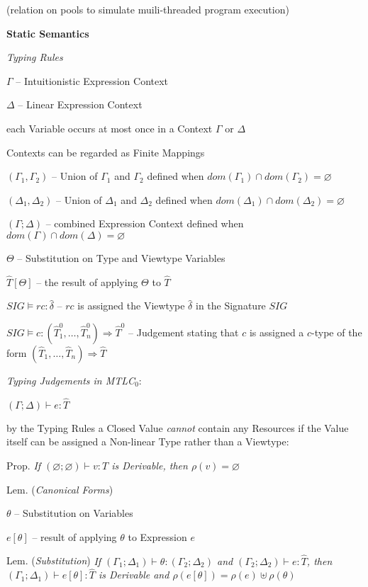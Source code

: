 (relation on pools to simulate muili-threaded program execution) %


\textbf{Static Semantics}

\emph{Typing Rules}


$\Gamma$ -- Intuitionistic Expression Context

$\Delta$ -- Linear Expression Context

each Variable occurs at most once in a Context $\Gamma$ or $\Delta$

Contexts can be regarded as Finite Mappings

$(\Gamma_1, \Gamma_2)$ -- Union of $\Gamma_1$ and $\Gamma_2$ defined
when $dom(\Gamma_1) \cap dom(\Gamma_2) = \varnothing$

$(\Delta_1, \Delta_2)$ -- Union of $\Delta_1$ and $\Delta_2$ defined
when $dom(\Delta_1) \cap dom(\Delta_2) = \varnothing$

$(\Gamma;\Delta)$ -- combined Expression Context defined when
$dom(\Gamma) \cap dom(\Delta) = \varnothing$

$\Theta$ -- Substitution on Type and Viewtype Variables %

$\hat{T}[\Theta]$ -- the result of applying $\Theta$ to $\hat{T}$

$SIG \vDash rc : \hat{\delta}$ -- $rc$ is assigned the Viewtype
$\hat{\delta}$ in the Signature $SIG$

$SIG \vDash c : (\hat{T}^0_1, \ldots, \hat{T}^0_n) \Rightarrow
\hat{T}^0$ -- Judgement stating that $c$ is assigned a $c$-type of the
form $(\hat{T}_1, \ldots, \hat{T}_n) \Rightarrow \hat{T}$

\emph{Typing Judgements in MTLC$_0$}:

$(\Gamma;\Delta) \vdash e : \hat{T}$

by the Typing Rules a Closed Value \emph{cannot} contain any Resources
if the Value itself can be assigned a Non-linear Type rather than a
Viewtype:

Prop. \emph{If $(\varnothing;\varnothing) \vdash v : T$ is Derivable,
  then $\rho(v) = \varnothing$}

Lem. (\emph{Canonical Forms})

$\theta$ -- Substitution on Variables

$e[\theta]$ -- result of applying $\theta$ to Expression $e$

Lem. (\emph{Substitution}) \emph{If $(\Gamma_1;\Delta_1) \vdash \theta
  : (\Gamma_2;\Delta_2)$ and $(\Gamma_2;\Delta_2) \vdash e : \hat{T}$,
  then $(\Gamma_1;\Delta_1) \vdash e[\theta] : \hat{T}$ is Derivable
  and $\rho(e[\theta]) = \rho(e) \uplus \rho(\theta)$}

